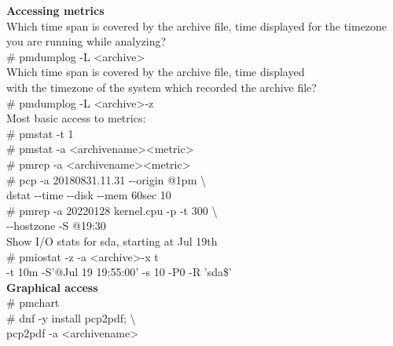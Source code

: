 \documentclass[12pt]{article}
\begin{document}
\begin{tcbposter}
{		\textbf{Accessing metrics} \\
		Which time span is covered by the archive file, time displayed
		for the timezone you are running while analyzing? \\
    	\hspace*{0.5cm}\# pmdumplog -L \textless archive\textgreater \\
		Which time span is covered by the archive file, time displayed \\
		with the timezone of the system which recorded the archive file? \\
    	\hspace*{0.5cm}\# pmdumplog -L \textless archive\textgreater -z \\
		Most basic access to metrics: \\
    	\hspace*{0.5cm}\# pmstat -t 1 \\
		\hspace*{0.5cm}\# pmstat -a \textless archivename\textgreater \textless metric\textgreater \\
		\hspace*{0.5cm}\# pmrep -a \textless archivename\textgreater \textless metric\textgreater \\
    	\hspace*{0.5cm}\# pcp -a 20180831.11.31 -\/-origin @1pm \textbackslash \\
    	\hspace*{1.0cm}   dstat -\/-time -\/-disk -\/-mem 60sec 10 \\
    	\hspace*{0.5cm}\# pmrep -a 20220128 kernel.cpu -p -t 300 \textbackslash \\
    	\hspace*{1.0cm}   -\/-hostzone -S @19:30 \\

		Show I/O stats for sda, starting at Jul 19th \\
    	\hspace*{0.5cm}\# pmiostat -z -a \textless archive\textgreater -x t \\
    	\hspace*{1.0cm}   -t 10m -S'@Jul 19 19:55:00' -s 10 -P0 -R 'sda\$' \\

		\textbf{Graphical access} \\
    	\hspace*{0.5cm}\# pmchart \\
    	\hspace*{0.5cm}\# dnf -y install pcp2pdf; \textbackslash \\
    	\hspace*{1.0cm}   pcp2pdf -a \textless archivename\textgreater \\
}


\end{tcbposter}
\end{document}
